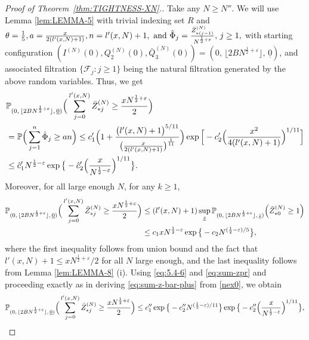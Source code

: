 \documentclass[11pt, reqno]{article}
\numberwithin{equation}{section}
\numberwithin{theorem}{section}
\begin{document}
\begin{proof}[Proof of Theorem~\ref{thm:TIGHTNESS-XN}.]
Take any $N\geq N''$. 
We will use Lemma \ref{lem:LEMMA-5}  with trivial indexing set $R$ and
$\theta =\frac{1}{5}, a=\frac{x}{2(l'(x,N)+1)},n=l'(x,N) + 1,\ \text{and}\  \hat{\Phi}_j=\frac{\Bar{Z}^{(N)}_{*(j-1)}}{N^{\frac{1}{2}+\varepsilon}}, \, j \ge 1,$
with starting configuration $(I^{(N)}(0), Q_2^{(N)}(0), \bar{Q}^{(N)}_3(0)) = (0, \, \lfloor 2BN^{\frac{1}{2}+\varepsilon} \rfloor, \,\underline{0})$, and associated filtration $\big\{\mathcal{F}_j : j\geq 1\big\}$ being the natural filtration generated by the above random variables.
Thus, we get
\begin{align}\label{eq:5.4-6}
    & \mathbb{P}_{(0, \, \lfloor 2BN^{\frac{1}{2}+\varepsilon} \rfloor, \, \underline{0})}\Big(\sum_{j=0}^{l'(x,N)}\Bar{Z}^{(N)}_{*j}\geq \frac{xN^{\frac{1}{2}+\varepsilon}}{2}\Big)\nonumber\\
    &=\mathbb{P}\Big(\sum_{j=1}^{n}\hat{\Phi}_j\geq an\Big)
    \leq  c'_1\Big(1+\frac{\big(l'(x,N) + 1\big)^{5/11}}{\big(\frac{x}{ 2(l'(x,N)+1)}\big)^{\frac{1}{11}}}\Big)\exp \Big[-c'_2\Big(\frac{x^2}{4(l'(x,N)+1)}\Big)^{1/11}\Big]\\\nonumber
    &\leq \hat{c}_1'N^{\frac{1}{2}-\varepsilon}\exp\big\{-\hat{c}'_2\Big(\frac{x}{N^{\frac{1}{2}-\varepsilon}}\Big)^{1/11}\big\}.\nonumber
\end{align}
Moreover, for all large enough $N$, for any $k\geq 1$,
\begin{align}\label{eq:sum-zpr}
     \mathbb{P}_{(0, \, \lfloor 2BN^{\frac{1}{2}+\varepsilon} \rfloor, \,\underline{0})}\Big(\sum_{j=0}^{l'(x,N)}\Bar{Z}^{(N)}_{*j}\geq \frac{xN^{\frac{1}{2}+\varepsilon}}{2}\Big)
     &\leq (l'(x,N) + 1) \sup_{\underline{z}}\mathbb{P}_{(0, \, \lfloor 2BN^{\frac{1}{2}+\varepsilon} \rfloor, \,\underline{z})}\Big(\Bar{Z}^{(N)}_{*0}\geq 1 \Big)\notag\\
    &\leq  c_1 xN^{\frac{1}{2}-\varepsilon}\exp \big\{-c_2N^{(\frac{1}{2}-\varepsilon)/5}\big\},
\end{align}
where the first inequality follows from union bound and the fact that $l'(x,N) + 1\leq xN^{\frac{1}{2}+\varepsilon}/2$ for all $N$ large enough, and the last inequality follows from Lemma \ref{lem:LEMMA-8} (i).
Using \eqref{eq:5.4-6} and \eqref{eq:sum-zpr} and proceeding exactly as in deriving \eqref{eq:sum-z-bar-plus} from \eqref{nex0}, we obtain
\begin{equation}\label{nex2}
 \mathbb{P}_{(0, \, \lfloor 2BN^{\frac{1}{2}+\varepsilon} \rfloor, \,\underline{0})}\Big(\sum_{j=0}^{l'(x,N)}\Bar{Z}^{(N)}_{*j}\geq \frac{xN^{\frac{1}{2}+\varepsilon}}{2}\Big) \le c_1''\exp \big\{-c_2''N^{(\frac{1}{2}-\varepsilon)/11}\big\}\exp\big\{-c''_2\Big(\frac{x}{N^{\frac{1}{2}-\varepsilon}}\Big)^{1/11}\big\},

\end{equation}
\end{proof}
\end{document}
